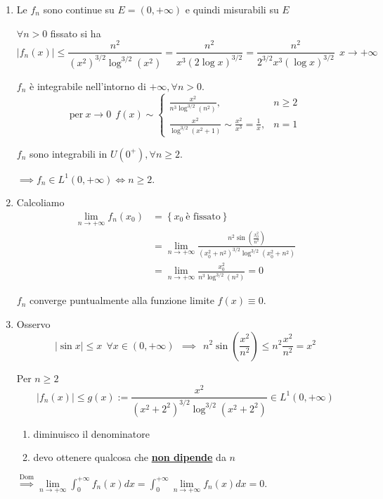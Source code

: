 \begin{enumerate}
\item Le $f_{n}$ sono continue su $E=( 0,+\infty )$ e quindi misurabili su $E$

$\forall n >0$ fissato si ha\begin{equation*}
| f_{n}( x)| \leqslant \frac{n^{2}}{\left( x^{2}\right)^{3/2}\log^{3/2}\left( x^{2}\right)} =\frac{n^{2}}{x^{3}( 2\log x)^{3/2}} =\frac{n^{2}}{2^{3/2} x^{3}(\log x)^{3/2}} \ \ x\rightarrow +\infty 
\end{equation*}

$f_{n}$ è integrabile nell'intorno di $+\infty ,\forall n >0$.\begin{equation*}
\text{per} \ x\rightarrow 0\ \ f( x) \sim \begin{cases}
\frac{x^{2}}{n^{3}\log^{3/2}\left( n^{2}\right)} , & n\geqslant 2\\
\frac{x^{2}}{\log^{3/2}\left( x^{2} +1\right)} \sim \frac{x^{2}}{x^{3}} =\frac{1}{x} , & n=1
\end{cases}
\end{equation*}

$f_{n}$ sono integrabili in $U\left( 0^{+}\right) ,\forall n\geqslant 2$.

$\implies f_{n} \in L^{1}( 0,+\infty ) \iff n\geqslant 2$.
\item Calcoliamo\begin{equation*}
\begin{aligned}
\lim _{n\rightarrow +\infty } f_{n}( x_{0}) & =\left\{x_{0} \ \text{è fissato}\right\}\\
 & =\lim _{n\rightarrow +\infty }\frac{n^{2}\sin\left(\frac{x^{2}_{0}}{n^{2}}\right)}{\left( x^{2}_{0} +n^{2}\right)^{3/2}\log^{3/2}\left( x^{2}_{0} +n^{2}\right)}\\
 & =\lim _{n\rightarrow +\infty }\frac{x^{2}_{0}}{n^{3}\log^{3/2}\left( n^{2}\right)} =0
\end{aligned}
\end{equation*}

$f_{n}$ converge puntualmente alla funzione limite $f( x) \equiv 0$.
\item Osservo\begin{equation*}
| \sin x| \leqslant x\ \ \forall x\in ( 0,+\infty ) \ \ \implies \ \ n^{2}\sin\left(\frac{x^{2}}{n^{2}}\right) \leqslant n^{2}\frac{x^{2}}{n^{2}} =x^{2}
\end{equation*}

Per $n\geqslant 2$\begin{equation*}
| f_{n}( x)| \leqslant g( x) :=\frac{x^{2}}{\left( x^{2} +2^{2}\right)^{3/2}\log^{3/2}\left( x^{2} +2^{2}\right)} \in L^{1}( 0,+\infty )
\end{equation*}
\begin{enumerate}
\item diminuisco il denominatore
\item devo ottenere qualcosa che \underline{\textbf{non dipende}} da $n$
\end{enumerate}

$\overset{\text{Dom}}{\implies }\lim\limits _{n\rightarrow +\infty }\int ^{+\infty }_{0} f_{n}( x) dx=\int ^{+\infty }_{0}\lim\limits _{n\rightarrow +\infty } f_{n}( x) dx=0$.
\end{enumerate}

